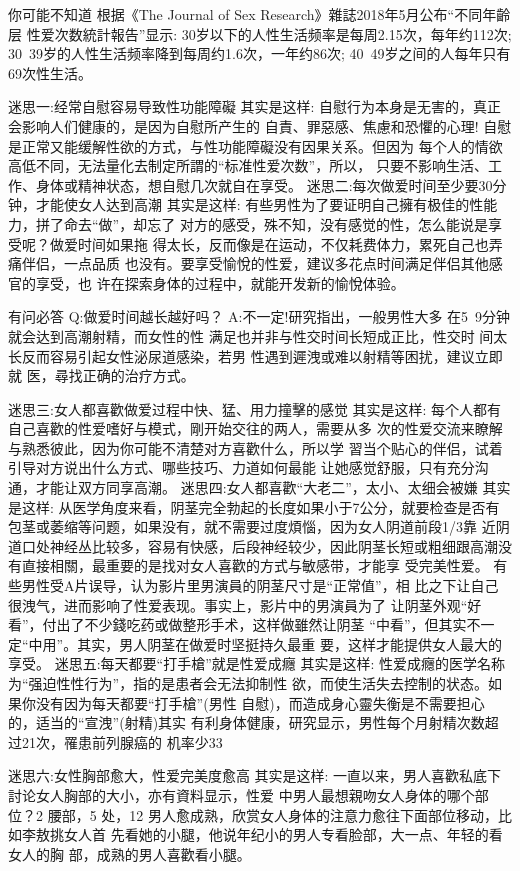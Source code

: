 \documentclass[12pt,UTF8]{ctexbook}
\begin{document}
你可能不知道
根据《The Journal of Sex Research》雜誌2018年5月公布“不同年齡层
性爱次数統計報告”显示:
30岁以下的人性生活频率是每周2.15次，每年约112次;
30~39岁的人性生活频率降到每周约1.6次，一年约86次;
40~49岁之间的人每年只有69次性生活。

迷思一:经常自慰容易导致性功能障礙
其实是这样:
自慰行为本身是无害的，真正会影响人们健康的，是因为自慰所产生的
自責、罪惡感、焦慮和恐懼的心理!
自慰是正常又能缓解性欲的方式，与性功能障礙没有因果关系。但因为
每个人的情欲高低不同，无法量化去制定所謂的“标准性爱次数”，所以，
只要不影响生活、工作、身体或精神状态，想自慰几次就自在享受。
迷思二:每次做爱时间至少要30分钟，才能使女人达到高潮
其实是这样:
有些男性为了要证明自己擁有极佳的性能力，拼了命去“做”，却忘了
对方的感受，殊不知，没有感觉的性，怎么能说是享受呢？做爱时间如果拖
得太长，反而像是在运动，不仅耗费体力，累死自己也弄痛伴侣，一点品质
也没有。要享受愉悅的性爱，建议多花点时间满足伴侣其他感官的享受，也
许在探索身体的过程中，就能开发新的愉悅体验。

有问必答
Q:做爱时间越长越好吗？
A:不一定!研究指出，一般男性大多
在5~9分钟就会达到高潮射精，而女性的性
满足也并非与性交时间长短成正比，性交时
间太长反而容易引起女性泌尿道感染，若男
性遇到遲洩或难以射精等困扰，建议立即就
医，尋找正确的治疗方式。

迷思三:女人都喜歡做爱过程中快、猛、用力撞擊的感觉
其实是这样:
每个人都有自己喜歡的性爱嗜好与模式，剛开始交往的两人，需要从多
次的性爱交流来瞭解与熟悉彼此，因为你可能不清楚对方喜歡什么，所以学
習当个贴心的伴侣，试着引导对方说出什么方式、哪些技巧、力道如何最能
让她感觉舒服，只有充分沟通，才能让双方同享高潮。
迷思四:女人都喜歡“大老二”，太小、太细会被嫌
其实是这样:
从医学角度来看，阴茎完全勃起的长度如果小于7公分，就要检查是否有
包茎或萎缩等问题，如果没有，就不需要过度煩惱，因为女人阴道前段1/3靠
近阴道口处神经丛比较多，容易有快感，后段神经较少，因此阴茎长短或粗细跟高潮没有直接相關，最重要的是找对女人喜歡的方式与敏感带，才能享
受完美性爱。
有些男性受A片误导，认为影片里男演員的阴茎尺寸是“正常值”，相
比之下让自己很洩气，进而影响了性爱表现。事实上，影片中的男演員为了
让阴茎外观“好看”，付出了不少錢吃药或做整形手术，这样做雖然让阴茎
“中看”，但其实不一定“中用”。其实，男人阴茎在做爱时坚挺持久最重
要，这样才能提供女人最大的享受。
迷思五:每天都要“打手槍”就是性爱成癮
其实是这样:
性爱成癮的医学名称为“强迫性性行为”，指的是患者会无法抑制性
欲，而使生活失去控制的状态。如果你没有因为每天都要“打手槍”(男性
自慰)，而造成身心靈失衡是不需要担心的，适当的“宣洩”(射精)其实
有利身体健康，研究显示，男性每个月射精次数超过21次，罹患前列腺癌的
机率少33%

迷思六:女性胸部愈大，性爱完美度愈高
其实是这样:
一直以来，男人喜歡私底下討论女人胸部的大小，亦有資料显示，性爱
中男人最想親吻女人身体的哪个部位？2%
腰部，5%
处，12%
男人愈成熟，欣赏女人身体的注意力愈往下面部位移动，比如李敖挑女人首
先看她的小腿，他说年纪小的男人专看脸部，大一点、年轻的看女人的胸
部，成熟的男人喜歡看小腿。
\end{document}
